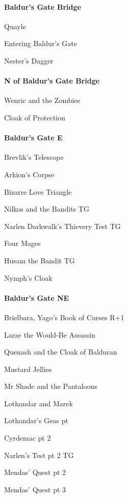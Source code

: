 \documentclass[10pt,a4,twoside]{book}
\begin{document}
\begin{multicols}{3}
\paragraph*{Baldur's Gate Bridge}
\begin{trivlist}
\item Quayle
\item Entering Baldur's Gate
\item Nester's Dagger  \label{dagger} %
\end{trivlist}

\paragraph*{N of Baldur's Gate Bridge}
\begin{trivlist}
\item Wenric and the Zombies
\item Cloak of Protection
\end{trivlist}

\paragraph*{Baldur's Gate E}
\begin{trivlist}
\item Brevlik's Telescope
\item Arkion's Corpse
\item Bizarre Love Triangle
\item Nilkos and the Bandits TG
\item Narlen Darkwalk's Thievery Test TG
\item Four Mages
\item Husam the Bandit TG
\item Nymph's Cloak
\end{trivlist}

\paragraph*{Baldur's Gate NE}
\begin{trivlist}
\item Brielbara, Yago's Book of Curses {\textcolor{OliveGreen}{R+1}}  \label{brielbara} %
\item Larze the Would-Be Assassin
\item Quenash and the Cloak of Balduran
\item Mustard Jellies
\item Mr Shade and the Pantaloons  \label{shade} %
\item Lothandar and Marek %
\item Lothandar's Geas pt %
\item Cyrdemac pt 2  \label{cyrdemac} %
\item Narlen's Test pt 2 TG
\item Mendas' Quest pt 2 %
\item Mendas' Quest pt 3 %
\end{trivlist}


\end{multicols}
\end{document}
